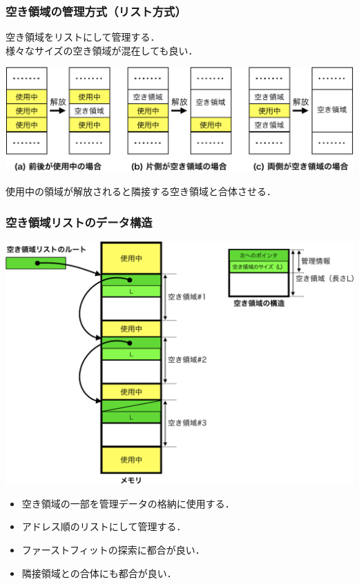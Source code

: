 \documentclass{beamer}                   %
\begin{document}
\begin{frame}
  \frametitle{空き領域の管理方式（リスト方式）}
  空き領域をリストにして管理する．\\
  様々なサイズの空き領域が混在しても良い．
  \begin{center}
    \includegraphics[scale=0.5]{Fig/memFree-crop.pdf}\\
  \end{center}
  使用中の領域が解放されると隣接する空き領域と合体させる．
\end{frame}

\begin{frame}
  \frametitle{空き領域リストのデータ構造}
  \begin{center}
    \includegraphics[scale=0.38]{Fig/linkedList-crop.pdf}\\
  \end{center}
  \begin{itemize}
    \item 空き領域の一部を管理データの格納に使用する．
    \item アドレス順のリストにして管理する．
    \item ファーストフィットの探索に都合が良い．
    \item 隣接領域との合体にも都合が良い．
  \end{itemize}
\end{frame}
\end{document}
